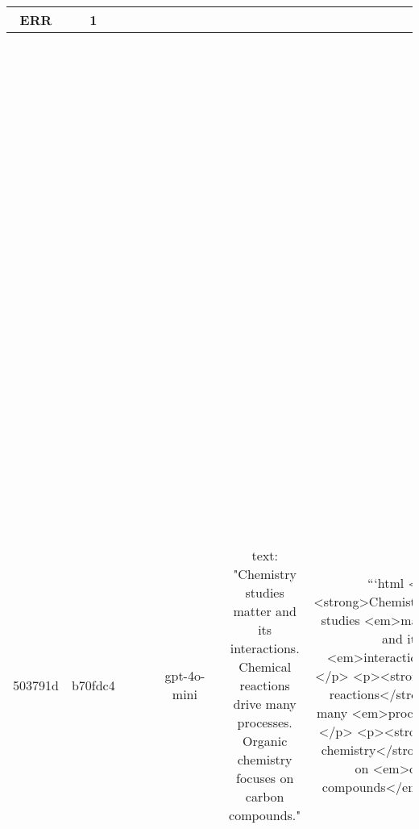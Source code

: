 \begin{table}[h!]
\begin{tabular}{|c|c|c|c|c|c|c|c|c|c|}
ERR & 1\\
\hline
503791d & b70fdc4 &  &  & gpt-4o-mini & text: "Chemistry studies matter and its interactions. Chemical reactions drive many processes. Organic chemistry focuses on carbon compounds." & ```html
<p><strong>Chemistry</strong> studies <em>matter</em> and its <em>interactions</em>.</p>
<p><strong>Chemical reactions</strong> drive many <em>processes</em>.</p>
<p><strong>Organic chemistry</strong> focuses on <em>carbon compounds</em>.</p>
``` & ok & The output complies with the parallel structure described in the guidelines. The paragraph has been split into individual sentences, each of which is wrapped in a `<p>` tag. There are at least three `<p>` tags in the output, which satisfies the requirement of having at least three `<p>` tags. Additionally, within each `<p>` tag, there is one `<strong>` tag, corresponding to an emphasized key word, and multiple `<em>` tags, which are used to emphasize additional key words or phrases. The description does not require any specific content for these tags, so the presence is sufficient for compliance. There are no instructions being violated, and overall the chatbot's output matches the formatting requirements specified in the description.

OK & 1\\
\hline
503791d & b70fdc4 &  &  & qwen2.5:3b & text: "Chemistry studies matter and its interactions. Chemical reactions drive many processes. Organic chemistry focuses on carbon compounds." & <p><strong>Chemistry</strong> studies <em>matter</em> and its <em>interactions</em>. Chemical reactions drive many processes. Organic <em>chemistry</em> focuses on <em>carbon compounds</em>.</p>
<p><strong>Chemistry</strong> studies <em>matter</em> and its <em>interactions</em>. Chemical reactions drive many processes. Organic <em>chemistry</em> focuses on <em>carbon compounds</em>.</p> & err & The output provided does not comply with the chatbot description. Upon examining the output, we observe the following violations:

1. The output includes only two `<p>` tags, which contain the same text, thereby repeating the content instead of formatting new sentences. According to the description, there should be at least three `<p>` tags, each wrapping individual sentences. This means that the requirement of having at least three `<p>` tags is not satisfied.

2. Although each `<p>` tag contains a `<strong>` tag and multiple `<em>` tags within it, the repetition of content does not contribute to fulfilling the requirement as each sentence should be represented in its own distinct `<p>` tag.


\end{tabular}
\end{table}
